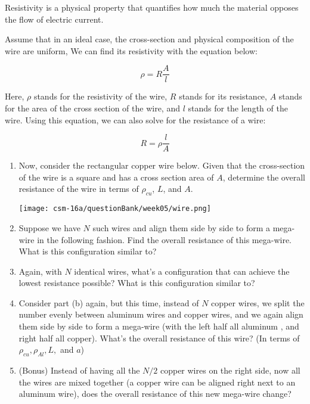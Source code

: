 \graphicspath{ {./} }

Resistivity is a physical property that quantifies how much the material opposes the flow of electric current.

Assume that in an ideal case, the cross-section and physical composition of the wire are uniform, We can find its resistivity with the equation below:

$$\rho = R \frac{A}{l}$$

Here, $\rho$ stands for the resistivity of the wire, $R$ stands for its resistance, $A$ stands for the area of the cross section of the wire, and $l$ stands for the length of the wire. Using this equation, we can also solve for the resistance of a wire:

$$R = \rho \frac{l}{A}$$

\begin{enumerate}
    \item Now, consider the rectangular copper wire below. Given that the cross-section of the wire is a square and has a cross section area of $A$, determine the overall resistance of the wire in terms of $\rho_{cu}$, $L$, and $A$.
    \begin{center}
            \texttt{[image: csm-16a/questionBank/week05/wire.png]}
    \end{center}
    \item Suppose we have $N$ such wires and align them side by side to form a mega-wire in the following fashion. Find the overall resistance of this mega-wire. What is this configuration similar to?
    \item Again, with $N$ identical wires, what's a configuration that can achieve the lowest resistance possible? What is this configuration similar to?
    \item Consider part (b) again, but this time, instead of $N$ copper wires, we split the number evenly between aluminum wires and copper wires, and we again align them side by side to form a mega-wire (with the left half all aluminum , and right half all copper). What's the overall resistance of this wire? (In terms of $\rho_{cu}, \rho_{Al}, L, $ and $a$)
    \item (Bonus) Instead of having all the $N/2$ copper wires on the right side, now all the wires are mixed together (a copper wire can be aligned right next to an aluminum wire), does the overall resistance of this new mega-wire change?
\end{enumerate}
